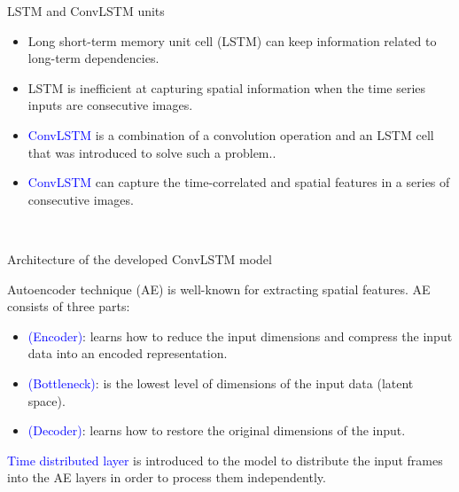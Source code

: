 \documentclass[10pt,aspectratio=169]{beamer} %
\begin{document}
\begin{frame}{LSTM and ConvLSTM units}
	\begin{minipage}[l]{0.55\textwidth}
		\begin{itemize}
			\item Long short-term memory unit cell (LSTM) can keep information related to long-term dependencies. 
			\item LSTM is inefficient at capturing spatial information when the time series inputs are consecutive images.
			\item \textcolor{blue}{ConvLSTM} is a combination of a convolution operation and an LSTM cell that was introduced to solve such a problem.. 
			\item \textcolor{blue}{ConvLSTM} can capture the time-correlated and spatial features in a series of consecutive images.
		\end{itemize}
	\end{minipage}
	\begin{minipage}[l]{0.4\textwidth}
		\begin{figure}
			\centering
			 \\
		\end{figure}
	\end{minipage}
\end{frame}

\setcounter{subfigure}{0}
\begin{frame}{Architecture of the developed ConvLSTM model}
	\begin{minipage}[l]{0.6\textwidth}
		Autoencoder technique (AE) is well-known for extracting spatial features.
		AE consists of three parts: 
		\begin{itemize}
			\item \textcolor{blue}{(Encoder)}: learns how to reduce the input dimensions and compress the input data into an encoded representation.
			\item \textcolor{blue}{(Bottleneck)}: is the lowest level of dimensions
			of the input data (latent space).
			\item \textcolor{blue}{(Decoder)}: learns how to restore the original dimensions of the input.		
		\end{itemize}
	 \textcolor{blue}{Time distributed layer}
	 is introduced to the model to distribute the input frames into the AE layers in order to process them independently.
 	\end{minipage}
	\begin{minipage}[l]{0.35\textwidth}
		\begin{figure}
		\end{figure}
	\end{minipage}
\end{frame}
\end{document}
